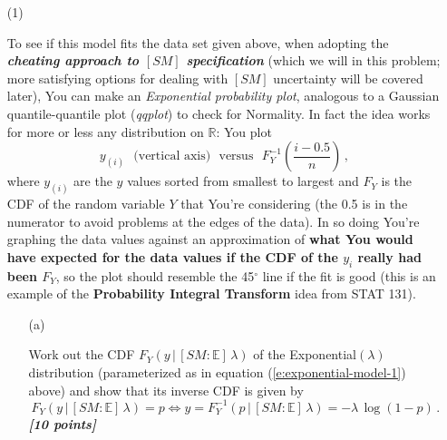 \documentclass[12pt]{article}
\newcommand{\given}{\, | \,}
\newcommand{\bi}[1]{\b{\i{#1}}}
\renewcommand{\b}[1]{\textbf{#1}}
\renewcommand{\i}[1]{\textit{#1}}
\begin{document}
\begin{itemize}
\begin{itemize}

\item[(1)]

To see if this model fits the data set given above, when adopting the \bi{cheating approach to $[ SM ]$ specification} (which we will in this problem; more satisfying options for dealing with $[ SM ]$ uncertainty will be covered later), You can make an \textit{Exponential probability plot}, analogous to a Gaussian quantile-quantile plot (\textit{qqplot}) to check for Normality. In fact the idea works for more or less any distribution on $\mathbb{ R }$: You plot 
\begin{equation} \label{e:probability-plot-1}
y_{ ( i ) } \ \ \ \mbox{(vertical axis)} \ \ \ \mbox{versus} \ \ \ F_Y^{ -1 } \left( \frac{ i - 0.5 }{ n }
\right) \, ,
\end{equation}
where $y_{ ( i ) }$ are the $y$ values sorted from smallest to largest and $F_Y$ is the CDF of the random variable $Y$ that You're considering (the 0.5 is in the numerator to avoid problems at the edges of the data). In so doing You're graphing the data values against an approximation of \b{what You would have expected for the data values if the CDF of the $y_i$ really had been $F_Y$}, so the plot should resemble the 45$^\circ$ line if the fit is good (this is an example of the \b{Probability Integral Transform} idea from STAT 131).  

\begin{itemize}

\item[(a)] 

Work out the CDF $F_Y ( y \given [ SM \! : \! \mathbb{ E } ] \, \lambda )$ of the Exponential$( \lambda )$ distribution (parameterized as in equation (\ref{e:exponential-model-1}) above)
and show that its inverse CDF is given by
\begin{equation} \label{e:probability-plot-2}
F_Y ( y \given [ SM \! : \! \mathbb{ E } ] \, \lambda ) = p \iff y = F_Y^{ -1 }( p \given [ SM \! : \! \mathbb{ E } ] \, \lambda ) = - \lambda \, \log ( 1 - p ) \, .
\end{equation}
\bi{[10 points]} 


\end{itemize}
\end{itemize}
\end{itemize}
\end{document}
